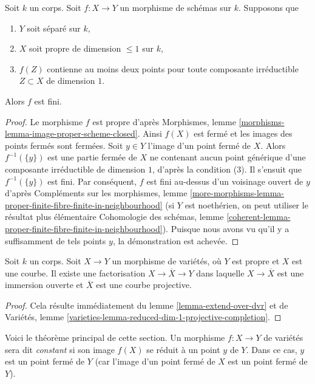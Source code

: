 \begin{lemma}
\label{lemma-finite}
Soit $k$ un corps. Soit $f : X \to Y$ un morphisme de schémas sur $k$. Supposons que \begin{enumerate} \item $Y$ soit séparé sur $k$, \item $X$ soit propre de dimension $\leq 1$ sur $k$, \item $f(Z)$ contienne au moins deux points pour toute composante irréductible $Z \subset X$ de dimension $1$. \end{enumerate} Alors $f$ est fini.
\end{lemma}

\begin{proof}
Le morphisme $f$ est propre d'après Morphismes, lemme \ref{morphisms-lemma-image-proper-scheme-closed}. Ainsi $f(X)$ est fermé et les images des points fermés sont fermées. Soit $y \in Y$ l'image d'un point fermé de $X$. Alors $f^{-1}(\{y\})$ est une partie fermée de $X$ ne contenant aucun point générique d'une composante irréductible de dimension $1$, d'après la condition (3). Il s'ensuit que $f^{-1}(\{y\})$ est fini. Par conséquent, $f$ est fini au-dessus d'un voisinage ouvert de $y$ d'après Compléments sur les morphismes, lemme \ref{more-morphisms-lemma-proper-finite-fibre-finite-in-neighbourhood} (si $Y$ est noethérien, on peut utiliser le résultat plus élémentaire Cohomologie des schémas, lemme \ref{coherent-lemma-proper-finite-fibre-finite-in-neighbourhood}). Puisque nous avons vu qu'il y a suffisamment de tels points $y$, la démonstration est achevée.
\end{proof}

\begin{lemma}
\label{lemma-extend-to-completion}
Soit $k$ un corps. Soit $X \to Y$ un morphisme de variétés, où $Y$ est propre et $X$ est une courbe. Il existe une factorisation $X \to \overline{X} \to Y$ dans laquelle $X \to \overline{X}$ est une immersion ouverte et $\overline{X}$ est une courbe projective.
\end{lemma}

\begin{proof}
Cela résulte immédiatement du lemme \ref{lemma-extend-over-dvr} et de Variétés, lemme \ref{varieties-lemma-reduced-dim-1-projective-completion}.
\end{proof}

\noindent
Voici le théorème principal de cette section. Un morphisme $f : X \to Y$ de variétés sera dit {\it constant} si son image $f(X)$ se réduit à un point $y$ de $Y$. Dans ce cas, $y$ est un point fermé de $Y$ (car l'image d'un point fermé de $X$ est un point fermé de $Y$).

